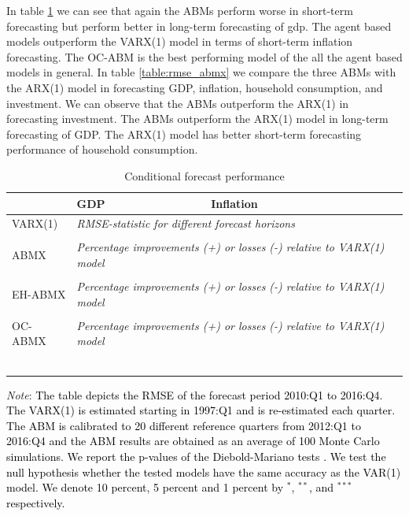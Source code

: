 {In table \ref{table:rmse_validation_abmx} we can see that again the ABMs perform worse in short-term forecasting but perform better in long-term forecasting of gdp. The agent based models outperform the VARX(1) model in terms of short-term inflation forecasting. The OC-ABM is the best performing model of the all the agent based models in general. In table \ref{table:rmse_abmx} we compare the three ABMs with the ARX(1) model in forecasting GDP, inflation, household consumption, and investment. We can observe that the ABMs outperform the ARX(1) in forecasting investment. The ABMs outperform the ARX(1) model in long-term forecasting of GDP. The ARX(1) model has better short-term forecasting performance of household consumption.
\begin{table}[!h]
	\caption{Conditional forecast performance} 
	\label{table:rmse_validation_abmx}
	\centering
		\begin{tabular}{lll}
			\toprule
			& GDP & Inflation \\
			\midrule
			VARX(1) & \multicolumn{2}{l}{\textit{RMSE-statistic for different forecast horizons}} \\ \midrule
			
            \\ \midrule
   			ABMX & \multicolumn{2}{l}{\textit{Percentage improvements (+) or losses (-) relative to VARX(1) model}} \\	\midrule 
			\\ \midrule 
            EH-ABMX & \multicolumn{2}{l}{\textit{Percentage improvements (+) or losses (-) relative to VARX(1) model}} \\	\midrule 
			\\ \midrule 
			OC-ABMX & \multicolumn{2}{l}{\textit{Percentage improvements (+) or losses (-) relative to VARX(1) model}} \\	\midrule 
			\\ \bottomrule \
		\end{tabular}
	\begin{tablenotes}
		\footnotesize \item \textit{Note}: \textcolor{black}{The table depicts the RMSE of the forecast period 2010:Q1 to 201\textcolor{black}{6}:Q4. The VARX(1) is estimated starting in 1997:Q1 and is re-estimated each quarter. The ABM is calibrated to \textcolor{black}{20} different reference quarters from 2012:Q1 to \textcolor{black}{2016:Q4} and the ABM results are obtained as an average of 100 Monte Carlo simulations. We report the p-values of the Diebold-Mariano tests \citep{harveyTestingEqualityPrediction1997}.  We test the null hypothesis whether the tested models have the same accuracy as the VAR(1) model. We denote  10 percent, 5 percent and 1 percent by $^{*}$, $^{**}$, and $^{***}$ respectively.}
	\end{tablenotes}
\end{table}

}

